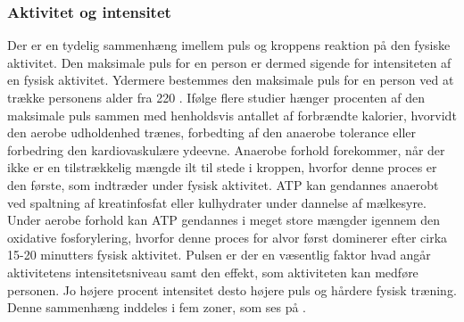 \subsubsection{Aktivitet og intensitet}\label{subsub:ak_int}
Der er en tydelig sammenhæng imellem puls og kroppens reaktion på den fysiske aktivitet. Den maksimale puls for en person er dermed sigende for intensiteten af en fysisk aktivitet. Ydermere bestemmes den maksimale puls for en person ved at trække personens alder fra 220 \citep{CooperBlair2005}.\newline
Ifølge flere studier hænger procenten af den maksimale puls sammen med henholdsvis antallet af forbrændte kalorier, hvorvidt den aerobe udholdenhed trænes, forbedting af den anaerobe tolerance eller forbedring den kardiovaskulære ydeevne. Anaerobe forhold forekommer, når der ikke er en tilstrækkelig mængde ilt til stede i kroppen, hvorfor denne proces er den første, som indtræder under fysisk aktivitet. ATP kan gendannes anaerobt ved spaltning af kreatinfosfat eller kulhydrater under dannelse af mælkesyre. \citep{Martini2012,Engelbreth2010} Under aerobe forhold kan ATP gendannes i meget store mængder igennem den oxidative fosforylering, hvorfor denne proces for alvor først dominerer efter cirka 15-20 minutters fysisk aktivitet. \citep{Martini2012,Engelbreth2010} \newline
Pulsen er der en væsentlig faktor hvad angår aktivitetens intensitetsniveau samt den effekt, som aktiviteten kan medføre personen. Jo højere procent intensitet desto højere puls og hårdere fysisk træning. Denne sammenhæng inddeles i fem zoner, som ses på . \citep{Leyland2007,Heartratejournal2015}
